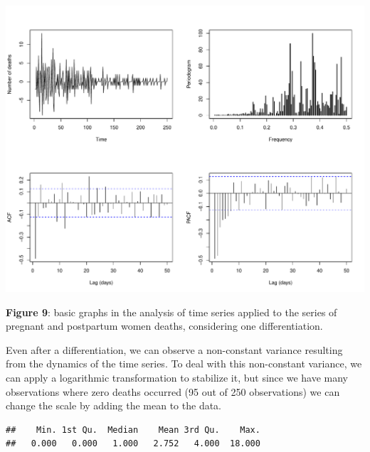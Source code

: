\documentclass[
]{article}
\newenvironment{Shaded}{\begin{snugshade}}{\end{snugshade}}
\newcommand{\DocumentationTok}[1]{\textcolor[rgb]{0.56,0.35,0.01}{\textbf{\textit{#1}}}}
\newcommand{\FunctionTok}[1]{\textcolor[rgb]{0.13,0.29,0.53}{\textbf{#1}}}
\newcommand{\NormalTok}[1]{#1}
\newcommand{\SpecialCharTok}[1]{\textcolor[rgb]{0.81,0.36,0.00}{\textbf{#1}}}
\renewenvironment{Shaded}{\begin{mdframed}[ backgroundcolor=shadecolor, linecolor = shadecolor, leftmargin=\dimexpr\leftmargin-2pt\relax, innerleftmargin=1.6pt, innertopmargin=5pt, skipabove=10pt,skipbelow=3pt ]}{\end{mdframed}}
\begin{document}
\begin{center}\includegraphics[width=\linewidth]{IF_results_ENG_files/figure-latex/dif1deaths-1} \end{center}

\textbf{Figure 9}: basic graphs in the analysis of time series applied
to the series of pregnant and postpartum women deaths, considering one
differentiation.

Even after a differentiation, we can observe a non-constant variance
resulting from the dynamics of the time series. To deal with this
non-constant variance, we can apply a logarithmic transformation to
stabilize it, but since we have many observations where zero deaths
occurred (95 out of 250 observations) we can change the scale by adding
the mean to the data.

\begin{Shaded}
\end{Shaded}

\begin{verbatim}
##    Min. 1st Qu.  Median    Mean 3rd Qu.    Max. 
##   0.000   0.000   1.000   2.752   4.000  18.000
\end{verbatim}
\end{document}
